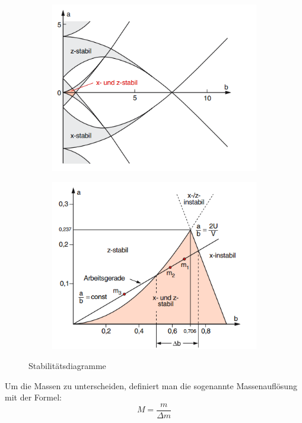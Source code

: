 \begin{figure}[h]
\centering
\begin{subfigure}{0.40\textwidth}
\includegraphics[width=\textwidth]{img/stab}
\end{subfigure}
\begin{subfigure}{0.40\textwidth}
\includegraphics[width=\textwidth]{img/qme2}
\end{subfigure}
\caption{Stabilitätsdiagramme} 
\end{figure}

Um die Massen zu unterscheiden, definiert man die sogenannte Massenauflösung mit der Formel:
\begin{equation}
M = \frac{m}{\Delta m}
\end{equation} 

